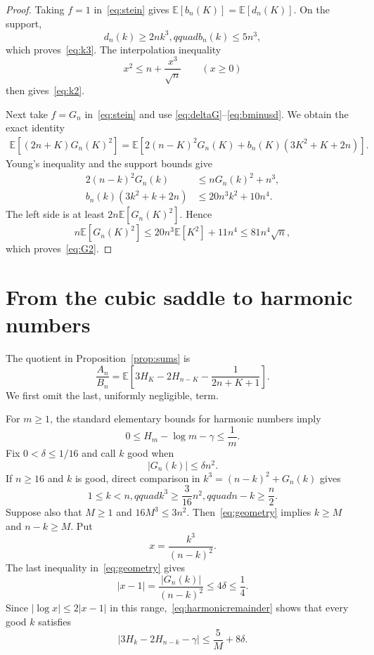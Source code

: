 \documentclass[11pt]{article}
\newcommand{\E}{\mathbb E}
\begin{document}
\begin{proof}
Taking $f=1$ in~\eqref{eq:stein} gives $\E[b_n(K)]=\E[d_n(K)]$.
On the support,
\[
 d_n(k)\ge2nk^3,qquad b_n(k)\le5n^3,
\]
which proves~\eqref{eq:k3}.  The interpolation inequality
\[
 x^2\le n+\frac{x^3}{\sqrt n}\qquad(x\ge0)
\]
then gives~\eqref{eq:k2}.

Next take $f=G_n$ in~\eqref{eq:stein} and use
\eqref{eq:deltaG}--\eqref{eq:bminusd}.  We obtain the exact identity
\begin{align*}
 \E[(2n+K)G_n(K)^2]
  =\E\!\left[2(n-K)^2G_n(K)
   +b_n(K)(3K^2+K+2n)\right].
\end{align*}
Young's inequality and the support bounds give
\begin{align*}
2(n-k)^2G_n(k)&\le nG_n(k)^2+n^3,\\
b_n(k)(3k^2+k+2n)&\le20n^3k^2+10n^4.
\end{align*}
The left side is at least $2n\E[G_n(K)^2]$.  Hence
\[
 n\E[G_n(K)^2]
 \le20n^3\E[K^2]+11n^4
 \le81n^4\sqrt n,
\]
which proves~\eqref{eq:G2}.
\end{proof}

\section{From the cubic saddle to harmonic numbers}

The quotient in Proposition~\ref{prop:sums} is
\begin{equation}\label{eq:weightedaverage}
 \frac{A_n}{B_n}
 =\E\!\left[3H_K-2H_{n-K}-\frac1{2n+K+1}\right].
\end{equation}
We first omit the last, uniformly negligible, term.

For $m\ge1$, the standard elementary bounds for harmonic numbers imply
\begin{equation}\label{eq:harmonicremainder}
 0\le H_m-\log m-\gamma\le\frac1m.
\end{equation}
Fix $0<\delta\le1/16$ and call $k$ good when
\[
 |G_n(k)|\le\delta n^2.
\]
If $n\ge16$ and $k$ is good, direct comparison in
$k^3=(n-k)^2+G_n(k)$ gives
\begin{equation}\label{eq:geometry}
 1\le k<n,qquad k^3\ge\frac3{16}n^2,qquad n-k\ge\frac n2.
\end{equation}
Suppose also that $M\ge1$ and $16M^3\le3n^2$.  Then~\eqref{eq:geometry}
implies $k\ge M$ and $n-k\ge M$.  Put
\[
 x=\frac{k^3}{(n-k)^2}.
\]
The last inequality in~\eqref{eq:geometry} gives
\[
 |x-1|=\frac{|G_n(k)|}{(n-k)^2}\le4\delta\le\frac14.
\]
Since $|\log x|\le2|x-1|$ in this range,~\eqref{eq:harmonicremainder}
shows that every good $k$ satisfies
\begin{equation}\label{eq:goodbound}
 |3H_k-2H_{n-k}-\gamma|\le\frac5M+8\delta.
\end{equation}
\end{document}
